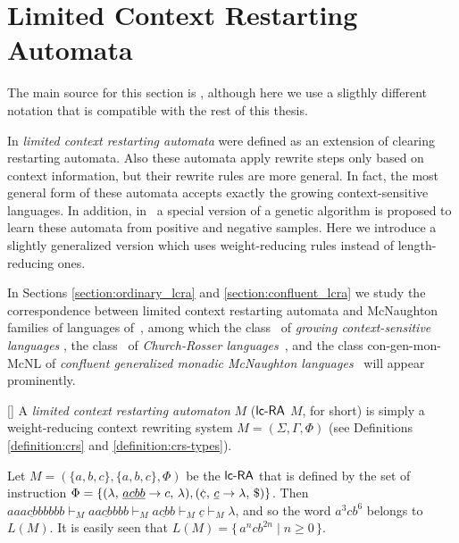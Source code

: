 \section{Limited Context Restarting Automata}\label{section:lcra}

The main source for this section is \cite{OCM13}, although here we use a sligthly different notation that is compatible with the rest of this thesis.

In \cite{B11} \emph{limited context restarting automata} were defined as an extension of clearing restarting automata. Also these automata apply rewrite steps only based on context information, but their rewrite rules are more general. In fact, the most general form of these automata accepts exactly the growing context-sensitive languages. In addition, in~\cite{B11} a special version of a genetic algorithm is proposed to learn these automata from positive and negative samples. Here we introduce a slightly generalized version which uses weight-reducing rules instead of length-reducing ones.

In Sections \ref{section:ordinary_lcra} and \ref{section:confluent_lcra} we study the correspondence between limited context restarting automata and McNaughton families of languages of~\cite{Beaudry2003}, among which the class \GCSL\ of \emph{growing context-sensitive languages} \cite{Buntrock19981,DW86}, the class \CRL\ of \emph{Church-Rosser languages}~\cite{MNO88}, and the class {\sf con-gen-mon-McNL} of \emph{confluent generalized monadic McNaughton languages}~\cite{Leupold2011} will appear prominently.

\begin{definition}\label{DefLCRA}[\cite{OCM13}]
A {\em limited context restarting automaton} $M$ ($\lcRA$ $M$, for short) is simply a weight-reducing context rewriting system $M=(\Sigma,\Gamma,\Phi)$ (see Definitions \ref{definition:crs} and \ref{definition:crs-types}).
\end{definition}

\begin{example}
Let $M=(\{a,b,c\},\{a,b,c\},\Phi)$ be the $\lcRA$ that is defined by the set of instruction $\Phi=\{\rarule{\lambda}{\underline{acbb}}{c}{\lambda},\rarule{\cent}{\underline{c}}{\lambda}{\$}\}$. Then $aa\underline{acbb}bbbb \vdash_M a\underline{acbb}bb \vdash_M \underline{acbb} \vdash_M \underline{c} \vdash_M \lambda$, and so the word $a^3cb^6$ belongs to $L(M)$. It is easily seen that $L(M) = \{\, a^ncb^{2n} \mid n \ge 0 \,\}$.
\end{example}

